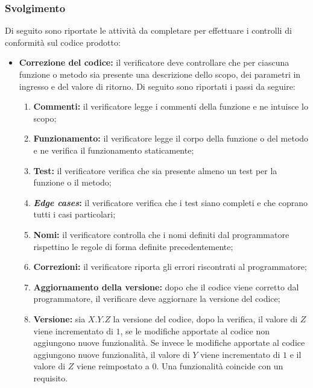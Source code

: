\subsubsection{Svolgimento}
Di seguito sono riportate le attività da completare per effettuare i controlli
di conformità sul codice prodotto:
\begin{itemize}
	\item \textbf{Correzione del codice:} il verificatore deve controllare che per
	      ciascuna funzione o metodo sia presente una descrizione dello scopo,
	      dei parametri in ingresso e del valore di ritorno. Di seguito sono
	      riportati i passi da seguire:
	      \begin{enumerate}
		      \item \textbf{Commenti:} il verificatore legge i commenti della
		            funzione e ne intuisce lo scopo;

		      \item \textbf{Funzionamento:} il verificatore legge il corpo
		            della funzione o del metodo e ne verifica il funzionamento
		            staticamente;

		      \item \textbf{Test:} il verificatore verifica che sia
		            presente almeno un test per la funzione o il metodo;

		      \item \textbf{\textit{Edge cases}:} il verificatore verifica
		            che i test siano completi e che coprano tutti i casi
		            particolari;

		      \item \textbf{Nomi:} il verificatore controlla che i nomi definiti
		            dal programmatore rispettino le regole di forma definite
		            precedentemente;

		      \item \textbf{Correzioni:} il verificatore riporta
		            gli errori riscontrati al programmatore;

		      \item \textbf{Aggiornamento della versione:} dopo che il codice
		            viene corretto dal programmatore, il verificare deve aggiornare
		            la versione del codice;

		      \item \textbf{Versione:} sia $X.Y.Z$ la versione del codice,
		            dopo la verifica, il valore di $Z$ viene incrementato di
		            $1$, se le modifiche apportate al codice non aggiungono
		            nuove funzionalità. Se invece le modifiche apportate al
		            codice aggiungono nuove funzionalità, il valore di $Y$ viene
		            incrementato di $1$ e il valore di $Z$ viene reimpostato a
		            $0$. Una funzionalità coincide con un requisito.
	      \end{enumerate}
\end{itemize}
